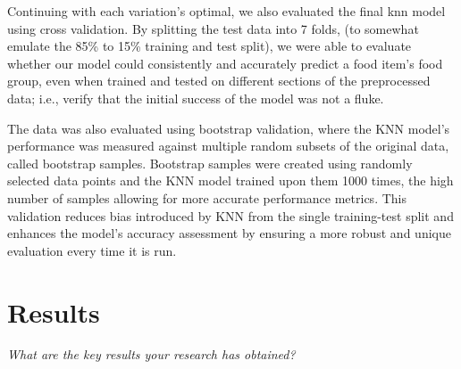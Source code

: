 \documentclass[11pt]{article}
\begin{document}
Continuing with each variation’s optimal, we also evaluated the final knn model using cross validation. By splitting the test data into 7 folds, (to somewhat emulate the 85\% to 15\% training and test split), we were able to evaluate whether our model could consistently and accurately predict a food item’s food group, even when trained and tested on different sections of the preprocessed data; i.e., verify that the initial success of the model was not a fluke.

The data was also evaluated using bootstrap validation, where the KNN model’s performance was measured against multiple random subsets of the original data, called bootstrap samples. Bootstrap samples were created using randomly selected data points and the KNN model trained upon them 1000 times, the high number of samples allowing for more accurate performance metrics. This validation reduces bias introduced by KNN from the single training-test split and enhances the model's accuracy assessment by ensuring a more robust and unique evaluation every time it is run.

\section{Results}
\emph{What are the key results your research has obtained?}
\end{document}
